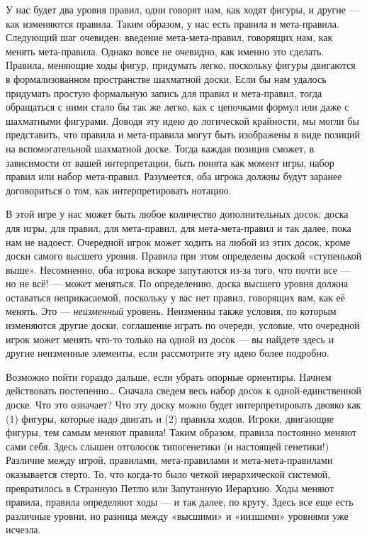 \documentclass[../main.tex]{subfiles}
\begin{document}
У нас будет два уровня правил, одни говорят нам, как ходят фигуры, и другие --- как изменяются правила. Таким образом, у нас есть правила и мета-правила. Следующий шаг очевиден: введение мета-мета-правил, говорящих нам, как менять мета-правила. Однако вовсе не очевидно, как именно это сделать. Правила, меняющие ходы фигур, придумать легко, поскольку фигуры двигаются в формализованном пространстве шахматной доски. Если бы нам удалось придумать простую формальную запись для правил и мета-правил, тогда обращаться с ними стало бы так же легко, как с цепочками формул или даже с шахматными фигурами. Доводя эту идею до логической крайности, мы могли бы представить, что правила и мета-правила могут быть изображены в виде позиций на вспомогательной шахматной доске. Тогда каждая позиция сможет, в зависимости от вашей интерпретации, быть понята как момент игры, набор правил или набор мета-правил. Разумеется, оба игрока должны будут заранее договориться о том, как интерпретировать нотацию.

В этой игре у нас может быть любое количество дополнительных досок: доска для игры, для правил, для мета-правил, для мета-мета-правил и так далее, пока нам не надоест. Очередной игрок может ходить на любой из этих досок, кроме доски самого высшего уровня. Правила при этом определены доской «ступенькой выше». Несомненно, оба игрока вскоре запутаются из-за того, что почти все --- но не всё! --- может меняться. По определению, доска высшего уровня должна оставаться неприкасаемой, поскольку у вас нет правил, говорящих вам, как её менять. Это --- \emph{неизменный} уровень. Неизменны также условия, по которым изменяются другие доски, соглашение играть по очереди, условие, что очередной игрок может менять что-то только на одной из досок --- вы найдете здесь и другие неизменные элементы, если рассмотрите эту идею более подробно.

Возможно пойти гораздо дальше, если убрать опорные ориентиры. Начнем действовать постепенно\ldots{} Сначала сведем весь набор досок к одной-единственной доске. Что это означает? Что эту доску можно будет интерпретировать двояко как (1) фигуры, которые надо двигать и (2) правила ходов. Игроки, двигающие фигуры, тем самым меняют правила! Таким образом, правила постоянно меняют сами себя. Здесь слышен отголосок типогенетики (и настоящей генетики!) Различие между игрой, правилами, мета-правилами и мета-мета-правилами оказывается стерто. То, что когда-то было четкой иерархической системой, превратилось в Странную Петлю или Запутанную Иерархию. Ходы меняют правила, правила определяют ходы --- и так далее, по кругу. Здесь все еще есть различные уровни, но разница между «высшими» и «низшими» уровнями уже исчезла.
\end{document}
